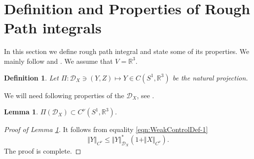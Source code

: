 \documentclass[11pt,a4paper,leqno]{amsart}%
\theoremstyle{plain}
\theoremstyle{remark}
\newtheorem{example}[theorem]{Example}
\theoremstyle{plain}
\newtheorem{lemma}[theorem]{Lemma}
\newtheorem{definition}[theorem]{Definition}
\numberwithin{equation}{section}
\def\Rnu{{\mathbb R}}
\begin{document}
\section{Definition and Properties of Rough Path integrals}
In this section we define rough path integral and state some of
its properties. We mainly follow \cite{[Gubinelli-2004]} and
\cite{[Bess+Gub_2005]}.  We assume that $V=\mathbb{R}^3$. 


\begin{definition}
Let $\Pi:\mathcal{D}_X\ni (Y,Z)\mapsto Y\in C(S^1,\Rnu^3)$ be the
natural projection.
\end{definition}
We will need following properties of the $\mathcal{D}_X$, see
\cite{[Gubinelli-2004]}.
\begin{lemma}\label{lem:HolderProp}
$\Pi(\mathcal{D}_X)\subset C^{\nu}(S^1,\Rnu^3)$.
\end{lemma}
\begin{proof}[Proof of Lemma \ref{lem:HolderProp}]
It follows from equality \eqref{eqn:WeakControlDef-1}
\begin{equation}
\Vert Y\Vert_{C^{\nu}}\leq
\Vert Y\Vert_{\mathcal{D}_X}^*(1+\Vert X\Vert_{C^{\nu}}).\label{eqn:HolderIneq}
\end{equation}
The proof is complete.
\end{proof}
\end{document}
